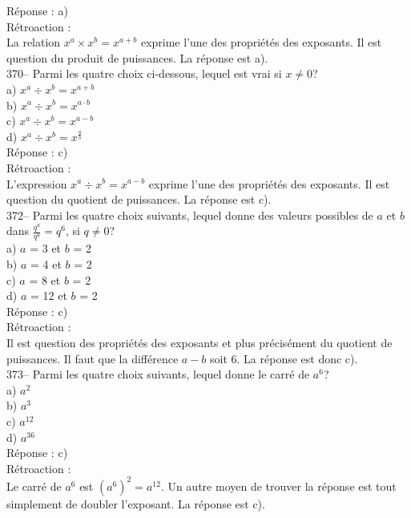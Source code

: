 ﻿\documentclass[letterpaper, 12pt]{article}
\begin{document}
R\'eponse : a)\\

R\'etroaction : \\
La relation $x^{a}\times x^{b}=x^{a+b}$ exprime l'une des propri\'et\'es des
exposants.  Il est question du produit de puissances.  La r\'eponse est a).
\\

370--  Parmi les quatre choix ci-dessous, lequel est vrai si $x \neq 0$?\\
a) $x^{a}\div x^{b}=x^{a+b}$\\
b) $x^{a}\div x^{b}=x^{a\cdot b}$\\
c) $x^{a}\div x^{b}=x^{a-b}$\\
d) $x^{a}\div x^{b}=x^{\frac{a}{b}}$\\

R\'eponse : c)\\

R\'etroaction : \\
L'expression $x^{a}\div x^{b}=x^{a-b}$ exprime  l'une des propri\'et\'es des
exposants.  Il est question du quotient de puissances.  La r\'eponse est
c).\\


372-- Parmi les quatre choix suivants, lequel donne des valeurs
possibles de $a$ et $b$ dans $\frac{q^a}{q^b}=q^{6}$, si
$q\neq0$?\\
a) $a$ = 3 et $b$ = 2\\
b) $a$ = 4 et $b$ = 2\\
c) $a$ = 8 et $b$ = 2\\
d) $a$ = 12 et $b$ = 2\\

R\'eponse : c)\\

R\'etroaction : \\
Il est question des propri\'et\'es des exposants et plus pr\'ecis\'ement du
quotient de puissances.  Il faut que la diff\'erence $a-b$ soit 6.  La
r\'eponse est donc c).\\

373-- Parmi les quatre choix suivants, lequel donne le carr\'e de $a^{6}$?\\
a) $a^{2}$\\
b) $a^{3}$\\
c) $a^{12}$\\
d) $a^{36}$\\

R\'eponse : c) \\

R\'etroaction : \\
Le carr\'e de $a^{6}$ est $\left( a^{6}\right)^{2}=a^{12}$.  Un autre moyen
de trouver la r\'eponse est tout simplement de doubler l'exposant.  La
r\'eponse est c).\\
\end{document}
